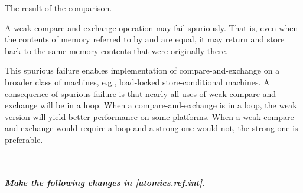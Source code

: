 \begin{itemdescr}
\begin{removedblock}
\pnum
\returns The result of the comparison.
\end{removedblock}

\pnum
\remarks A weak compare-and-exchange operation may fail spuriously.
That is, even when the contents of memory referred to
by  and  are equal,
it may return  and
store back to  the same memory contents
that were originally there.
\begin{note}
This spurious failure enables implementation of compare-and-exchange
on a broader class of machines, e.g., load-locked store-conditional machines.
A consequence of spurious failure is
that nearly all uses of weak compare-and-exchange will be in a loop.
When a compare-and-exchange is in a loop,
the weak version will yield better performance on some platforms.
When a weak compare-and-exchange would require a loop and
a strong one would not, the strong one is preferable.
\end{note}
\end{itemdescr}

~\\
~\\

\textbf{\textit{Make the following changes in [atomics.ref.int].}} \\

